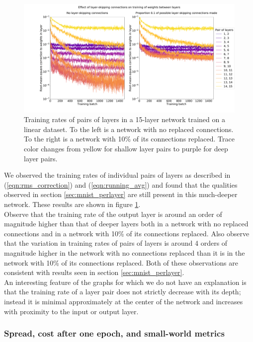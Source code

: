 \documentclass{article}
\newcommand{\npar}{\\\indent}
\begin{document}
\begin{figure}
  \centering
  \includegraphics[width=\textwidth]{figures/Linear_individual_layer_training.pdf}
  \caption{Training rates of pairs of layers in a 15-layer network trained on a linear dataset. To the left is a network with no replaced connections. To the right is a network with 10\% of its connections replaced. Trace color changes from yellow for shallow layer pairs to purple for deep layer pairs.}
  \label{fig:linear_layers}
\end{figure}

We observed the training rates of individual pairs of layers as described in (\ref{eqn:rms_correction}) and (\ref{eqn:running_avg}) and found that the qualities observed in section \ref{sec:mnist_perlayer} are still present in this much-deeper network. These results are shown in figure \ref{fig:linear_layers}.
\npar
Observe that the training rate of the output layer is around an order of magnitude higher than that of deeper layers both in a network with no replaced connections and in a network with 10\% of its connections replaced. Also observe that the variation in training rates of pairs of layers is around 4 orders of magnitude higher in the network with no connections replaced than it is in the network with 10\% of its connections replaced. Both of these observations are consistent with results seen in section \ref{sec:mnist_perlayer}.
\npar
An interesting feature of the graphs for which we do not have an explanation is that the training rate of a layer pair does not strictly decrease with its depth; instead it is minimal approximately at the center of the network and increases with proximity to the input or output layer.

\subsubsection{Spread, cost after one epoch, and small-world metrics}
\end{document}

